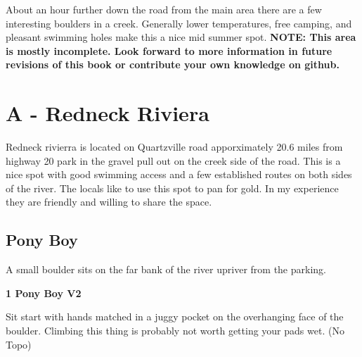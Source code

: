 \raggedcolumns
\begin{multicols}{2}
About an hour further down the road from the main area there are a few interesting boulders in a creek. Generally lower temperatures, free camping, and pleasant swimming holes make this a nice mid summer spot.
\newline
\textbf{NOTE: This area is mostly incomplete. Look forward to more information in future revisions of this book or contribute your own knowledge on github.}

\newpage
		\section{A - Redneck Riviera}\label{sa:Redneck Riviera}
	\begin{minipage}{\columnwidth}
	Redneck rivierra is located on Quartzville road apporximately 20.6 miles from highway 20 park in the gravel pull out on the creek side of the road. This is a nice spot with good swimming access and a few established routes on both sides of the river. The locals like to use this spot to pan for gold. In my experience they are friendly and willing to share the space.
	\end{minipage}
	
			\begin{minipage}{\columnwidth}
			\subsection*{Pony Boy}\label{bf:Pony Boy}
			A small boulder sits on the far bank of the river upriver from the parking.
			
			\end{minipage}
			
					\begin{minipage}{\linewidth}	
					\label{rt:Pony Boy}
\colorbox{green!20}{
\parbox{0.95\textwidth}{
\textbf{
1 Pony Boy V2  
}
}
}

					\begin{adjustwidth}{0.5cm}{}				
					Sit start with hands matched in a juggy pocket on the overhanging face of the boulder. Climbing this thing is probably not worth getting your pads wet.
						\newline (No Topo) 
					\end{adjustwidth}
					\end{minipage}
			\begin{minipage}{\columnwidth}

\end{minipage}
\end{multicols}
